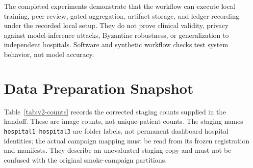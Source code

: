 \documentclass[12pt,a4paper]{report}
\begin{document}
The completed experiments demonstrate that the workflow can execute local training, peer review, gated aggregation, artifact storage, and ledger recording under the recorded local setup. They do not prove clinical validity, privacy against model-inference attacks, Byzantine robustness, or generalization to independent hospitals. Software and synthetic workflow checks test system behavior, not model accuracy.

\section{Data Preparation Snapshot}
Table~\ref{tab:v2-counts} records the corrected staging counts supplied in the handoff. These are image counts, not unique-patient counts. The staging names \texttt{hospital1}--\texttt{hospital3} are folder labels, not permanent dashboard hospital identities; the actual campaign mapping must be read from its frozen registration and manifests. They describe an unevaluated staging copy and must not be confused with the original smoke-campaign partitions.

\begin{table}[htbp]
\centering
\caption{Corrected staging v2 image counts by hospital and split}
\label{tab:v2-counts}
\end{table}
\end{document}
